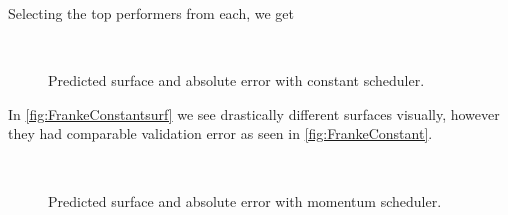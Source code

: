 \documentclass{article}
\theoremstyle{definition}
\begin{document}
Selecting the top performers from each, we get

\begin{figure}[H]%
    \centering
    \\
    \caption{Predicted surface and absolute error with constant scheduler.}%
    \label{fig:FrankeConstantsurf}%
\end{figure}

In \autoref{fig:FrankeConstantsurf} we see drastically different surfaces visually, however they had comparable validation error as seen in \autoref{fig:FrankeConstant}. 

\begin{figure}[H]%
    \centering
    \\
    \caption{Predicted surface and absolute error with momentum scheduler.}%
    \label{fig:FrankeMomentumsurf}%
\end{figure}
\end{document}
